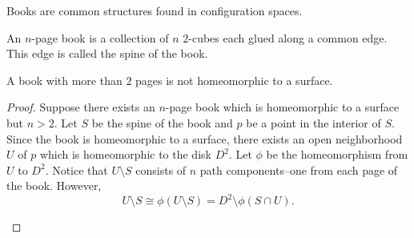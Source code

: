 Books are common structures found in configuration spaces.

\begin{defn}
    An \(n\)-page book is a collection of \(n\) \(2\)-cubes each glued along a common edge.
    This edge is called the spine of the book.
\end{defn}
\begin{thm}
A book with more than \(2\) pages is not homeomorphic to a surface.
\end{thm}
\begin{proof}
Suppose there exists an \(n\)-page book which is homeomorphic to a surface but \(n > 2\).
Let \(S\) be the spine of the book and \(p\) be a point in the interior of \(S\).
Since the book is homeomorphic to a surface, there exists an open neighborhood \(U\) of \(p\)
which is homeomorphic to the disk \(D^2\). Let \(\phi\) be the homeomorphism from \(U\) to \(D^2\).
Notice that \(U \setminus S\) consists of \(n\) path components--one from each page of the book.
However,
\[
U\setminus S \cong \phi(U\setminus S) = D^2 \setminus \phi(S \cap U).
\]
\begin{figure}[h!]
    \centering
\end{figure}
\end{proof}

